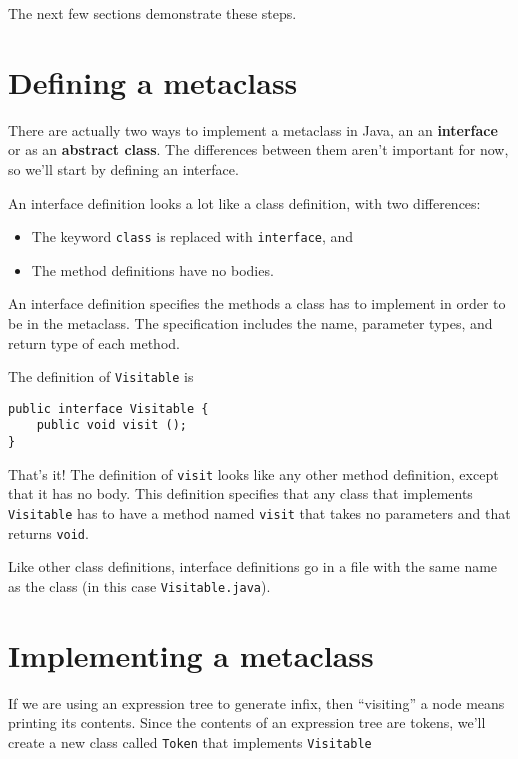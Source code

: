 The next few sections demonstrate these steps.


\section {Defining a metaclass}

There are actually two ways to implement a metaclass in Java,
an an {\bf interface} or as an {\bf abstract class}.  The differences
between them aren't important for now, so we'll start by
defining an interface.

An interface definition looks a lot like a class
definition, with two differences:

\begin{itemize}

\item The keyword {\tt class} is replaced with {\tt interface}, and

\item The method definitions have no bodies.

\end{itemize}

An interface definition specifies the methods a class has to
implement in order to be in the metaclass.  The specification
includes the name, parameter
types, and return type of each method.

The definition of {\tt Visitable} is

\begin{verbatim}
public interface Visitable {
    public void visit ();
}
\end{verbatim}
%
That's it!  The definition of {\tt visit} looks like any other
method definition, except that it has no body.  This definition
specifies that any class that implements {\tt Visitable} has to have
a method named {\tt visit} that takes no parameters and that returns
{\tt void}.


Like other class definitions, interface definitions go in a file
with the same name as the class (in this case {\tt Visitable.java}).


\section {Implementing a metaclass}

If we are using an expression tree to generate infix, then
``visiting'' a node means printing its contents.  Since the
contents of an expression tree are tokens, we'll create a new
class called {\tt Token} that implements {\tt Visitable}


